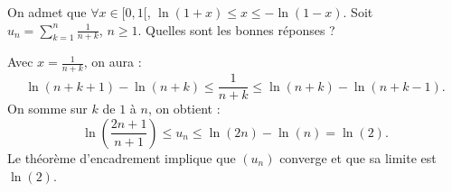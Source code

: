 \begin{question}
On admet que $\forall x \in [0,1[$, $\ln (1+x)\leq x\leq -\ln (1-x)$. Soit $\displaystyle u_n=\sum _{k=1}^n\frac{1}{n+k}$, $n\geq 1$. Quelles sont les bonnes réponses ?
\begin{answers} 
\end{answers}
\begin{explanations}
Avec $\displaystyle x=\frac{1}{n+k}$, on aura :
$$\ln(n+k+1)-\ln (n+k)\leq \frac{1}{n+k}\leq \ln(n+k)-\ln (n+k-1).$$
On somme sur $k$ de $1$ à $n$, on obtient :
$$\ln \left(\frac{2n+1}{n+1}\right)\leq u_n\leq \ln (2n)-\ln (n)=\ln (2).$$
Le théorème d'encadrement implique que $(u_n)$ converge et que sa limite est $\ln (2)$.
\end{explanations}
\end{question}
